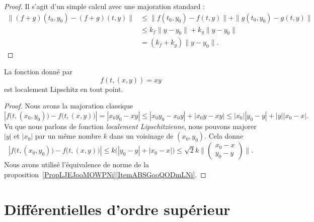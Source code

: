 \begin{proof}
	Il s'agit d'un simple calcul avec une majoration standard :
	\begin{subequations}
		\begin{align}
			\| (f+g)(t_0,y_0)-(f+g)(t,y) \| & \leq \|  f(t_0,y_0)-f(t,y)  \|+\| g(t_0,y_0)-g(t,y) \| \\
			                                & \leq k_f\| y-y_0 \|+k_g\| y-y_0 \|                     \\
			                                & =(k_f+k_g)\| y-y_0 \|.
		\end{align}
	\end{subequations}
\end{proof}

\begin{lemma}   \label{LemCFZUooVqZmpc}
	La fonction donné par
	\begin{equation}
		f(t, (x,y) )=xy
	\end{equation}
	est localement Lipschitz en tout point.
\end{lemma}

\begin{proof}
	Nous avons la majoration classique
	\begin{equation}
		| f\big(t,(x_0,y_0)\big)-f\big( t,(x,y) \big) |=| x_0y_0-xy |\leq| x_0y_0-x_0y |+| x_0y-xy |\leq | x_0 || y_0-y |+| y || x_0-x |.
	\end{equation}
	Vu que nous parlons de fonction \emph{localement Lipschitzienne}, nous pouvons majorer \( | y |\) et \( | x_0 |\) par un même nombre \( k\) dans un voisinage de \( (x_0,y_0)\). Cela donne
	\begin{equation}
		| f\big(t,(x_0,y_0)\big)-f\big( t,(x,y) \big) |\leq k\big( | y_0-y |+| x_0-x | \big)\leq \sqrt{2}k\| \begin{pmatrix}
			x_0-x \\
			y_0-y
		\end{pmatrix}\|.
	\end{equation}
	Nous avons utilisé l'équivalence de norme de la proposition~\ref{PropLJEJooMOWPNi}\ref{ItemABSGooQODmLNi}.
\end{proof}

\section{Différentielles d'ordre supérieur}		\label{SecDiffOrdSup}

